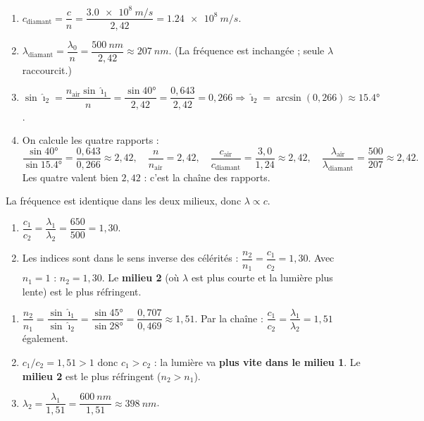 \documentclass[11pt,a4paper]{article}
\begin{document}
\begin{corrige}
\begin{enumerate}[label=\alph*)]
  \item $c_{\text{diamant}}=\dfrac{c}{n}=\dfrac{\qty{3.0e8}{m/s}}{2{,}42}=\qty{1.24e8}{m/s}$.
  \item $\lambda_{\text{diamant}}=\dfrac{\lambda_0}{n}=\dfrac{\qty{500}{nm}}{2{,}42}\approx\qty{207}{nm}$.
        (La fréquence est inchangée ; seule $\lambda$ raccourcit.)
  \item $\sin\hat{\imath}_2=\dfrac{n_{\text{air}}\sin\hat{\imath}_1}{n}=\dfrac{\sin\ang{40}}{2{,}42}
        =\dfrac{0{,}643}{2{,}42}=0{,}266\Rightarrow\hat{\imath}_2=\arcsin(0{,}266)\approx\ang{15.4}$.
  \item On calcule les quatre rapports :
        \[ \frac{\sin\ang{40}}{\sin\ang{15.4}}=\frac{0{,}643}{0{,}266}\approx2{,}42,\quad
           \frac{n}{n_{\text{air}}}=2{,}42,\quad
           \frac{c_{\text{air}}}{c_{\text{diamant}}}=\frac{3{,}0}{1{,}24}\approx2{,}42,\quad
           \frac{\lambda_{\text{air}}}{\lambda_{\text{diamant}}}=\frac{500}{207}\approx2{,}42. \]
        Les quatre valent bien $2{,}42$ : c'est la chaîne des rapports.
\end{enumerate}
\end{corrige}

\begin{corrige}
La fréquence est identique dans les deux milieux, donc $\lambda\propto c$.
\begin{enumerate}[label=\alph*)]
  \item $\dfrac{c_1}{c_2}=\dfrac{\lambda_1}{\lambda_2}=\dfrac{650}{500}=1{,}30$.
  \item Les indices sont dans le sens inverse des célérités : $\dfrac{n_2}{n_1}=\dfrac{c_1}{c_2}=1{,}30$.
        Avec $n_1=1$ : $\boxed{n_2=1{,}30}$. Le \textbf{milieu 2} (où $\lambda$ est plus courte et la
        lumière plus lente) est le plus réfringent.
\end{enumerate}
\end{corrige}

\begin{corrige}
\begin{enumerate}[label=\alph*)]
  \item $\dfrac{n_2}{n_1}=\dfrac{\sin\hat{\imath}_1}{\sin\hat{\imath}_2}
        =\dfrac{\sin\ang{45}}{\sin\ang{28}}=\dfrac{0{,}707}{0{,}469}\approx1{,}51$.
        Par la chaîne : $\dfrac{c_1}{c_2}=\dfrac{\lambda_1}{\lambda_2}=1{,}51$ également.
  \item $c_1/c_2=1{,}51>1$ donc $c_1>c_2$ : la lumière va \textbf{plus vite dans le milieu 1}. Le
        \textbf{milieu 2} est le plus réfringent ($n_2>n_1$).
  \item $\lambda_2=\dfrac{\lambda_1}{1{,}51}=\dfrac{\qty{600}{nm}}{1{,}51}\approx\qty{398}{nm}$.
\end{enumerate}
\end{corrige}
\end{document}
